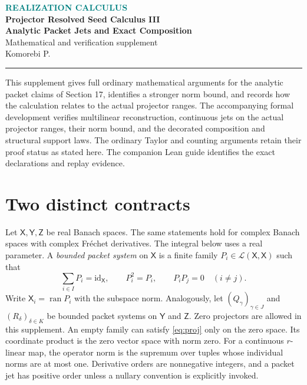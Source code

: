 \documentclass[11pt]{article}
\theoremstyle{remark}\newtheorem{remark}[theorem]{Remark}
\newcommand{\X}{\mathsf X}\newcommand{\Y}{\mathsf Y}\newcommand{\Z}{\mathsf Z}
\newcommand{\id}{\mathrm{id}}
\newcommand{\op}{\operatorname}
\begin{document}
\begin{center}
{\small\bfseries\textcolor{teal}{REALIZATION CALCULUS}}\\[5pt]
{\Large\bfseries Projector Resolved Seed Calculus III}\\[7pt]
{\LARGE\bfseries Analytic Packet Jets and Exact Composition}\\[8pt]
{\large Mathematical and verification supplement}\\[8pt]
{\normalsize Komorebi P.}
\end{center}
\vspace{6pt}
\noindent\rule{\linewidth}{.8pt}
\vspace{4pt}
This supplement gives full ordinary mathematical arguments for the analytic packet claims of Section 17, identifies a stronger norm bound, and records how the calculation relates to the actual projector ranges. The accompanying formal development verifies multilinear reconstruction, continuous jets on the actual projector ranges, their norm bound, and the decorated composition and structural support laws. The ordinary Taylor and counting arguments retain their proof status as stated here. The companion Lean guide identifies the exact declarations and replay evidence.

\section{Two distinct contracts}
Let $\X,\Y,\Z$ be real Banach spaces. The same statements hold for complex Banach spaces with complex Fr\'echet derivatives. The integral below uses a real parameter. A \emph{bounded packet system} on $\X$ is a finite family $P_i\in\mathcal L(\X,\X)$ such that
\begin{equation}\label{eq:proj}
\sum_{i\in I}P_i=\id_{\X},\qquad P_i^2=P_i,\qquad P_iP_j=0\quad(i\ne j).
\end{equation}
Write $\X_i=\op{ran}P_i$ with the subspace norm. Analogously, let $(Q_\gamma)_{\gamma\in J}$ and $(R_\delta)_{\delta\in K}$ be bounded packet systems on $\Y$ and $\Z$. Zero projectors are allowed in this supplement. An empty family can satisfy \eqref{eq:proj} only on the zero space. Its coordinate product is the zero vector space with norm zero. For a continuous $r$-linear map, the operator norm is the supremum over tuples whose individual norms are at most one. Derivative orders are nonnegative integers, and a packet jet has positive order unless a nullary convention is explicitly invoked.
\end{document}
